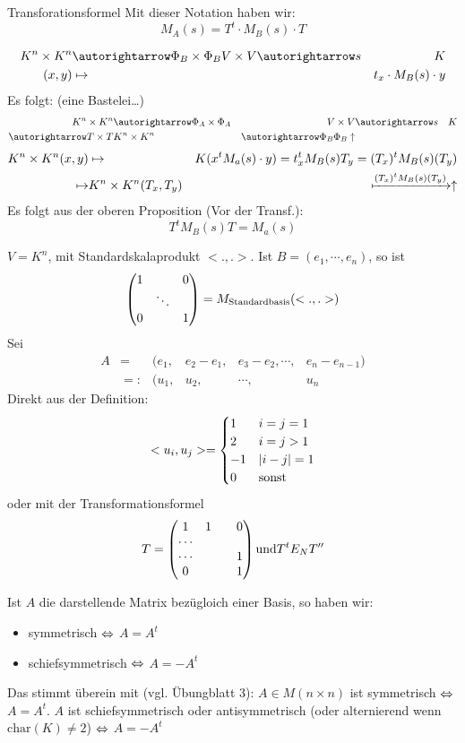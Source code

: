 \begin{Prop}{Transforationsformel}
  Mit dieser Notation haben wir:
  \[M_A(s)=T^t\cdot M_B(s)\cdot T\]
\end{Prop}
\begin{Bew}
  \begin{align*}
    K^n\times K^n &\ara{\Phi_B\times\Phi_B}{} V\times V\ara{s}{}&K\\
    (x,y)&\mapsto&t_x\cdot M_B(s)\cdot y
  \end{align*}
  Es folgt: (eine Bastelei\ldots)
  \begin{align*}
    K^n\times K^n&\ara{\Phi_A\times\Phi_A}{}&V\times V&\ara{s}{}&K\\
    \ara{T\times T}{}&K^n\times K^n&\ara{\Phi_B\Phi_B}{}\uparrow&&
  \end{align*}
  \begin{align*}
    K^n\times K^n (x,y)&\mapsto& K(x^tM_a(s)\cdot y)=t_x^tM_B(s)T_y = (T_x)^tM_B(s)(T_y)\\
    \mapsto&K^n\times K^n(T_x,T_y)&\xmapsto{(T_x)^tM_B(s)(T_y)}\uparrow
  \end{align*}
  Es folgt aus der oberen Proposition (Vor der Transf.):
  \[T^tM_B(s)T=M_a(s)\]
\end{Bew}
\begin{Bsp}
  $V=K^n$, mit Standardskalaprodukt $<.,.>$. Ist $B=(e_1,\cdots,e_n)$, so ist
  \[\begin{pmatrix}1&&0\\&\ddots&\\0&&1\end{pmatrix}=M_{\text{Standardbasis}}(<.,.>)\]
  Sei
  \begin{align*}
    A&=& (e_1,&e_2-e_1,&e_3-e_2,\cdots,&e_n-e_{n-1})\\
    &=:& (u_1,&u_2,&\cdots,&u_n
  \end{align*}
  Direkt aus der Definition:
  \[<u_i,u_j>=\begin{cases} 1& i=j=1 \\ 2&i=j>1\\ -1& \left| i-j \right|=1 \\ 0&\text{sonst}\end{cases} \]
  oder mit der Transformationsformel
  \[T=\begin{pmatrix}1&1&&0\\\cdots\\\cdots&&&1\\0&&&1\end{pmatrix} \text{und} T^tE_N T''\]
\end{Bsp}
\begin{Bem}
  Ist $A$ die darstellende Matrix bezügloich einer Basis, so haben wir:
  \begin{itemize}
    \item symmetrisch $\Leftrightarrow$ $A=A^t$
    \item schiefsymmetrisch $\Leftrightarrow$ $A=-A^t$
  \end{itemize}
  Das stimmt überein mit (vgl. Übungblatt 3): $A\in M(n\times n)$ ist symmetrisch $\Leftrightarrow$ $A=A^t$. $A$ ist schiefsymmetrisch oder antisymmetrisch (oder alternierend wenn $\text{char}(K)\neq 2$) $\Leftrightarrow$ $A=-A^t$
\end{Bem}
